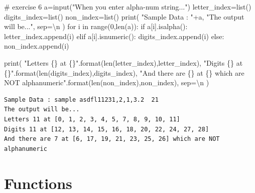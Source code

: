 \documentclass[
  letterpaper,
  DIV=11,
  numbers=noendperiod]{scrreprt}
\newenvironment{Shaded}{\begin{snugshade}}{\end{snugshade}}
\newcommand{\BuiltInTok}[1]{\textcolor[rgb]{0.00,0.23,0.31}{#1}}
\newcommand{\CharTok}[1]{\textcolor[rgb]{0.13,0.47,0.30}{#1}}
\newcommand{\CommentTok}[1]{\textcolor[rgb]{0.37,0.37,0.37}{#1}}
\newcommand{\ControlFlowTok}[1]{\textcolor[rgb]{0.00,0.23,0.31}{#1}}
\newcommand{\DecValTok}[1]{\textcolor[rgb]{0.68,0.00,0.00}{#1}}
\newcommand{\KeywordTok}[1]{\textcolor[rgb]{0.00,0.23,0.31}{#1}}
\newcommand{\NormalTok}[1]{\textcolor[rgb]{0.00,0.23,0.31}{#1}}
\newcommand{\OperatorTok}[1]{\textcolor[rgb]{0.37,0.37,0.37}{#1}}
\newcommand{\SpecialCharTok}[1]{\textcolor[rgb]{0.37,0.37,0.37}{#1}}
\newcommand{\StringTok}[1]{\textcolor[rgb]{0.13,0.47,0.30}{#1}}
\begin{document}
\begin{Shaded}
\begin{Highlighting}[]
\CommentTok{\# exercise 6}
\NormalTok{a}\OperatorTok{=}\BuiltInTok{input}\NormalTok{(}\StringTok{"When you enter alpha{-}num string..."}\NormalTok{)}
\NormalTok{letter\_index}\OperatorTok{=}\BuiltInTok{list}\NormalTok{()}
\NormalTok{digits\_index}\OperatorTok{=}\BuiltInTok{list}\NormalTok{()}
\NormalTok{non\_index}\OperatorTok{=}\BuiltInTok{list}\NormalTok{()}
\BuiltInTok{print}\NormalTok{(}
    \StringTok{"Sample Data : "}\OperatorTok{+}\NormalTok{a,}
    \StringTok{"The output will be..."}\NormalTok{,}
\NormalTok{    sep}\OperatorTok{=}\StringTok{\textquotesingle{}}\CharTok{\textbackslash{}n}\StringTok{\textquotesingle{}}
\NormalTok{)}
\ControlFlowTok{for}\NormalTok{ i }\KeywordTok{in} \BuiltInTok{range}\NormalTok{(}\DecValTok{0}\NormalTok{,}\BuiltInTok{len}\NormalTok{(a)):}
    \ControlFlowTok{if}\NormalTok{ a[i].isalpha():}
\NormalTok{        letter\_index.append(i)}
    \ControlFlowTok{elif}\NormalTok{ a[i].isnumeric():}
\NormalTok{        digits\_index.append(i)}
    \ControlFlowTok{else}\NormalTok{: non\_index.append(i)}

\BuiltInTok{print}\NormalTok{(}
    \StringTok{"Letters }\SpecialCharTok{\{\}}\StringTok{ at }\SpecialCharTok{\{\}}\StringTok{"}\NormalTok{.}\BuiltInTok{format}\NormalTok{(}\BuiltInTok{len}\NormalTok{(letter\_index),letter\_index),}
    \StringTok{"Digits }\SpecialCharTok{\{\}}\StringTok{ at }\SpecialCharTok{\{\}}\StringTok{"}\NormalTok{.}\BuiltInTok{format}\NormalTok{(}\BuiltInTok{len}\NormalTok{(digits\_index),digits\_index),}
    \StringTok{"And there are }\SpecialCharTok{\{\}}\StringTok{ at }\SpecialCharTok{\{\}}\StringTok{ which are NOT alphanumeric"}\NormalTok{.}\BuiltInTok{format}\NormalTok{(}\BuiltInTok{len}\NormalTok{(non\_index),non\_index),}
\NormalTok{    sep}\OperatorTok{=}\StringTok{\textquotesingle{}}\CharTok{\textbackslash{}n}\StringTok{\textquotesingle{}}
\NormalTok{)}
\end{Highlighting}
\end{Shaded}

\begin{verbatim}
Sample Data : sample asdfl11231,2,1,3.2  21
The output will be...
Letters 11 at [0, 1, 2, 3, 4, 5, 7, 8, 9, 10, 11]
Digits 11 at [12, 13, 14, 15, 16, 18, 20, 22, 24, 27, 28]
And there are 7 at [6, 17, 19, 21, 23, 25, 26] which are NOT alphanumeric
\end{verbatim}

\chapter{Functions}\label{functions}
\end{document}
